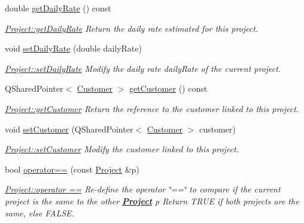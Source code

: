 \begin{DoxyCompactItemize}
double \hyperlink{classModels_1_1Project_a46d74a7452e712d223f1ca444a4cc180}{get\-Daily\-Rate} () const 
\begin{DoxyCompactList}\small\item\em \hyperlink{classModels_1_1Project_a46d74a7452e712d223f1ca444a4cc180}{Project\-::get\-Daily\-Rate} Return the daily rate estimated for this project. \end{DoxyCompactList}\item 
void \hyperlink{classModels_1_1Project_a9bc03d9632334a550bd25f6286d2c7a2}{set\-Daily\-Rate} (double daily\-Rate)
\begin{DoxyCompactList}\small\item\em \hyperlink{classModels_1_1Project_a9bc03d9632334a550bd25f6286d2c7a2}{Project\-::set\-Daily\-Rate} Modify the daily rate {\itshape daily\-Rate} of the current project. \end{DoxyCompactList}\item 
Q\-Shared\-Pointer$<$ \hyperlink{classModels_1_1Customer}{Customer} $>$ \hyperlink{classModels_1_1Project_ad15f442a24c9d42144b73f27a7afaa35}{get\-Customer} () const 
\begin{DoxyCompactList}\small\item\em \hyperlink{classModels_1_1Project_ad15f442a24c9d42144b73f27a7afaa35}{Project\-::get\-Customer} Return the reference to the customer linked to this project. \end{DoxyCompactList}\item 
void \hyperlink{classModels_1_1Project_a9d305edf054735b911e144516d3eccba}{set\-Customer} (Q\-Shared\-Pointer$<$ \hyperlink{classModels_1_1Customer}{Customer} $>$ customer)
\begin{DoxyCompactList}\small\item\em \hyperlink{classModels_1_1Project_a9d305edf054735b911e144516d3eccba}{Project\-::set\-Customer} Modify the {\itshape customer} linked to this project. \end{DoxyCompactList}\item 
bool \hyperlink{classModels_1_1Project_a2f322e63f6b42273c24093b9df46c2d6}{operator==} (const \hyperlink{classModels_1_1Project}{Project} \&p)
\begin{DoxyCompactList}\small\item\em \hyperlink{classModels_1_1Project_a2f322e63f6b42273c24093b9df46c2d6}{Project\-::operator ==} Re-\/define the operator \char`\"{}==\char`\"{} to compare if the current project is the same to the other {\bfseries \hyperlink{classModels_1_1Project}{Project}} {\itshape p} Return T\-R\-U\-E if both projects are the same, else F\-A\-L\-S\-E. \end{DoxyCompactList}\item 

\end{DoxyCompactItemize}
